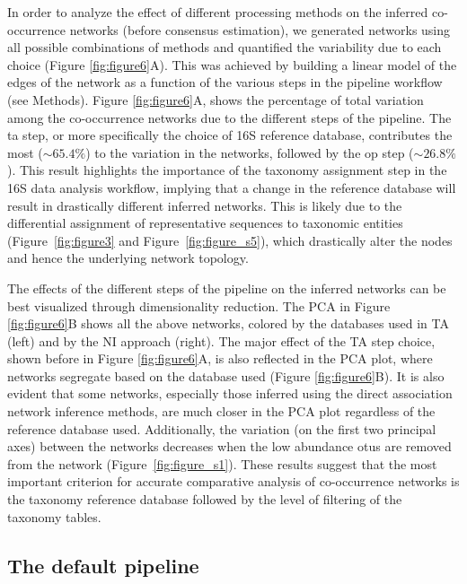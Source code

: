   In order to analyze the effect of different processing methods on the inferred co-occurrence networks (before consensus estimation), we generated networks using all possible combinations of methods and quantified the variability due to each choice (Figure \ref{fig:figure6}A).
 This was achieved by building a linear model of the edges of the network as a function of the various steps in the pipeline workflow (see Methods).
  Figure \ref{fig:figure6}A, shows the percentage of total variation among the co-occurrence networks due to the different steps of the pipeline.
  The \ac{ta} step, or more specifically the choice of 16S reference database, contributes the most ($\sim65.4\%$) to the variation in the networks, followed by the \ac{op} step ($\sim26.8\%$).
  This result highlights the importance of the taxonomy assignment step in the 16S data analysis workflow, implying that a change in the reference database will result in drastically different inferred networks.
  This is likely due to the differential assignment of representative sequences to taxonomic entities (Figure~\ref{fig:figure3} and Figure~\ref{fig:figure_s5}), which drastically alter the nodes and hence the underlying network topology.

  The effects of the different steps of the pipeline on the inferred networks can be best visualized through dimensionality reduction.
  The PCA in Figure \ref{fig:figure6}B shows all the above networks, colored by the databases used in TA (left) and by the NI approach (right).
  The major effect of the TA step choice, shown before in Figure \ref{fig:figure6}A, is also reflected in the PCA plot, where networks segregate based on the database used (Figure \ref{fig:figure6}B).
  It is also evident that some networks, especially those inferred using the direct association network inference methods, are much closer in the PCA plot regardless of the reference database used.
  Additionally, the variation (on the first two principal axes) between the networks decreases when the low abundance \ac{otu}s are removed from the network (Figure~\ref{fig:figure_s1}).
  These results suggest that the most important criterion for accurate comparative analysis of co-occurrence networks is the taxonomy reference database followed by the level of filtering of the taxonomy tables.

  \FloatBarrier

  \subsection*{The default pipeline}

